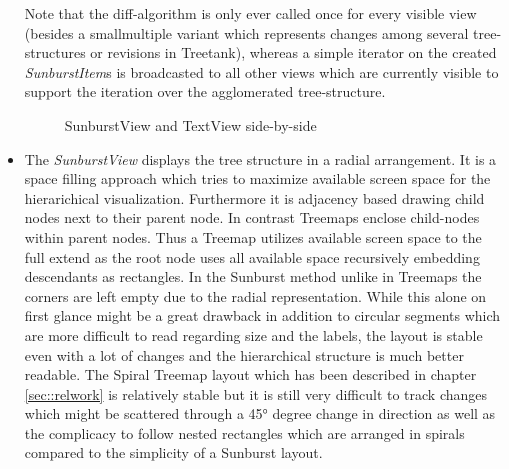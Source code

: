 \begin{itemize}
Note that the diff-algorithm is only ever called once for every visible view (besides a smallmultiple variant which represents changes among several tree-structures or revisions in Treetank), whereas a simple iterator on the created \emph{SunburstItem}s is broadcasted to all other views which are currently visible to support the iteration over the agglomerated tree-structure.

\begin{figure}[tb]
\caption{\label{fig:sunbursttextview} SunburstView and TextView side-by-side}
\end{figure}

\item
The \emph{SunburstView} displays the tree structure in a radial arrangement. It is a space filling approach which tries to maximize available screen space for the hierarichical visualization. Furthermore it is adjacency based drawing child nodes next to their parent node. In contrast Treemaps enclose child-nodes within parent nodes. Thus a Treemap utilizes available screen space to the full extend as the root node uses all available space recursively embedding descendants as rectangles. In the Sunburst method unlike in Treemaps the corners are left empty due to the radial representation. While this alone on first glance might be a great drawback in addition to circular segments which are more difficult to read regarding size and the labels, the layout is stable even with a lot of changes and the hierarchical structure is much better readable. The Spiral Treemap layout which has been described in chapter \ref{sec::relwork} is relatively stable but it is still very difficult to track changes which might be scattered through a 45° degree change in direction as well as the complicacy to follow nested rectangles which are arranged in spirals compared to the simplicity of a Sunburst layout.


\end{itemize}
